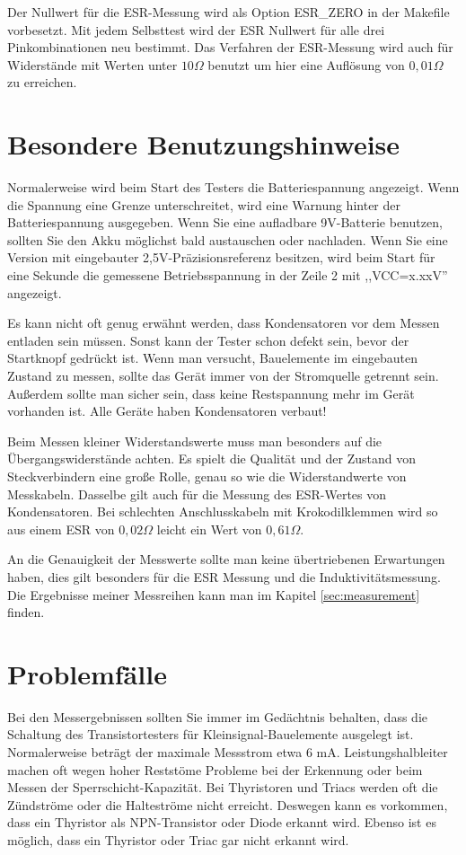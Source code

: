 Der Nullwert für die ESR-Messung wird als Option ESR\_ZERO in der Makefile vorbesetzt.
Mit jedem Selbsttest wird der ESR Nullwert für alle drei Pinkombinationen neu bestimmt.
Das Verfahren der ESR-Messung wird auch für Widerstände mit Werten unter \(10 \Omega\) benutzt um
hier eine Auflösung von \(0,01 \Omega\) zu erreichen.

\section{Besondere Benutzungshinweise}
Normalerweise wird beim Start des Testers die Batteriespannung angezeigt. Wenn die Spannung eine Grenze unterschreitet, 
wird eine Warnung hinter der Batteriespannung ausgegeben. Wenn Sie eine aufladbare 9V-Batterie benutzen, sollten Sie
den Akku möglichst bald austauschen oder nachladen.
Wenn Sie eine Version mit eingebauter 2,5V-Präzisionsreferenz besitzen, wird beim Start für eine Sekunde die
gemessene Betriebsspannung in der Zeile 2 mit ,,VCC=x.xxV'' angezeigt.

Es kann nicht oft genug erwähnt werden, dass Kondensatoren vor dem Messen entladen sein müssen.
Sonst kann der Tester schon defekt sein, bevor der Startknopf gedrückt ist.
Wenn man versucht, Bauelemente im eingebauten Zustand zu messen, sollte das Gerät immer von
der Stromquelle getrennt sein. Außerdem sollte man sicher sein, dass keine Restspannung mehr
im Gerät vorhanden ist. Alle Geräte haben Kondensatoren verbaut!

Beim Messen kleiner Widerstandswerte muss man besonders auf die Übergangswiderstände achten.
Es spielt die Qualität und der Zustand von Steckverbindern eine große Rolle, genau so wie die
Widerstandwerte von Messkabeln. Dasselbe gilt auch für die Messung des ESR-Wertes von Kondensatoren.
Bei schlechten Anschlusskabeln mit Krokodilklemmen wird so aus einem ESR von \(0,02 \Omega\) leicht
ein Wert von \(0,61 \Omega\).

An die Genauigkeit der Messwerte sollte man keine übertriebenen Erwartungen haben, dies gilt besonders
für die ESR Messung und die Induktivitätsmessung.
Die Ergebnisse meiner Messreihen kann man im Kapitel \ref{sec:measurement} finden.


\section{Problemfälle}
Bei den Messergebnissen sollten Sie immer im Gedächtnis behalten, dass die Schaltung des Transistortesters für
Kleinsignal-Bauelemente ausgelegt ist. Normalerweise beträgt der maximale Messstrom etwa 6 mA.
Leistungshalbleiter machen oft wegen hoher Reststöme Probleme bei der Erkennung oder beim Messen der
Sperrschicht-Kapazität.
Bei Thyristoren und Triacs werden oft die Zündströme oder die Halteströme nicht erreicht. Deswegen kann es
vorkommen, dass ein Thyristor als NPN-Transistor oder Diode erkannt wird. Ebenso ist es möglich, dass ein 
Thyristor oder Triac gar nicht erkannt wird.


